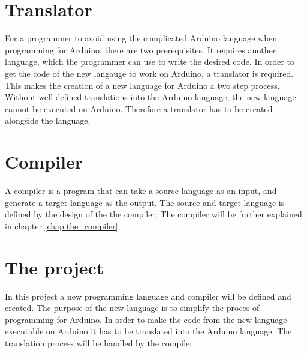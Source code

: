 \section{Translator}
For a programmer to avoid using the complicated Arduino language when programming for Arduino, there are two prerequisites. It requires another language, which the programmer can use to write the desired code. In order to get the code of the new langauge to work on Arduino, a translator is required. This makes the creation of a new language for Arduino a two step process. Without well-defined translations into the Arduino language, the new language cannot be executed on Arduino. Therefore a translator has to be created alongside the language.

\section{Compiler}
A compiler is a program that can take a source language as an input, and generate a target language as the output. The source and target language is defined by the design of the the compiler. The compiler will be further explained in chapter \ref{chap:the_compiler} 

\section{The project}
In this project a new programming language and compiler will be defined and created. The purpose of the new language is to simplify the proces of programming for Arduino. In order to make the code from the new language executable on Arduino it has to be translated into the Arduino language. The translation process will be handled by the compiler. 